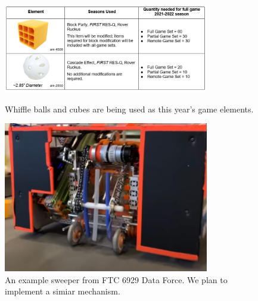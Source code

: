\begin{figure}[ht]
\centering
\begin{minipage}[b]{.50\textwidth}
  \centering
  \includegraphics[width=0.8\textwidth]{Meetings/August/08-20-21/8-18-21_CAD_Image1 - Nathan Forrer.png}
  \caption{Whiffle balls and cubes are being used as this year's game elements.}
  \label{fig:pic1}
\end{minipage}%
\hfill%
\begin{minipage}[b]{.50\textwidth}
  \centering
  \includegraphics[width=0.8\textwidth]{Meetings/August/08-20-21/8-18-21_CAD_Image2 - Nathan Forrer.jpg}
  \caption{An example sweeper from FTC 6929 Data Force. We plan to implement a simiar mechanism.}
  \label{fig:pic2}
\end{minipage}
\end{figure}

